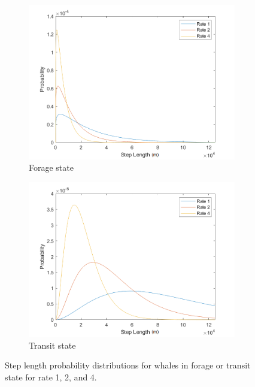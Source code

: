 \documentclass[11pt]{article}
\begin{document}
\begin{figure}[H]
	\centering
	\begin{subfigure}{3.1in}
		\includegraphics[width=\textwidth]{forage_pdf.png}
		\caption{Forage state}
	\end{subfigure}
	\begin{subfigure}{3in}
		\includegraphics[width=\textwidth]{transit_pdf.png}
		\caption{Transit state}
	\end{subfigure}
    \caption{Step length probability distributions for whales in forage or transit state for rate 1, 2, and 4.}
    \label{fig:steplengthforage}    
    \label{fig:steplengthtransit}
\end{figure}
\end{document}
